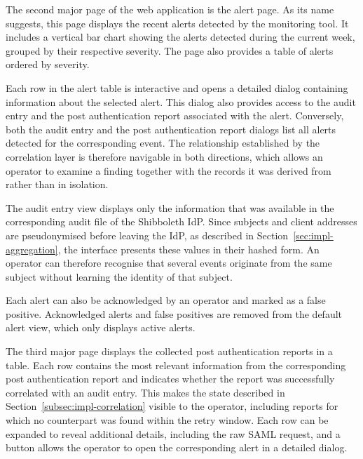 \documentclass[../main.tex]{subfiles}
\begin{document}
The second major page of the web application is the alert page. 
As its name suggests, this page displays the recent alerts detected by the monitoring tool. 
It includes a vertical bar chart showing the alerts detected during the current week, grouped by 
their respective severity. 
The page also provides a table of alerts ordered by severity.

Each row in the alert table is interactive and opens a detailed dialog containing information about 
the selected alert. 
This dialog also provides access to the audit entry and the post authentication report associated with the 
alert. 
Conversely, both the audit entry and the post authentication report dialogs list all alerts detected for 
the corresponding event. 
The relationship established by the correlation layer is therefore navigable in both directions, 
which allows an operator to examine a finding together with the records it was derived from rather 
than in isolation.

The audit entry view displays only the information that was available in the corresponding audit 
file of the Shibboleth IdP. 
Since subjects and client addresses are pseudonymised before leaving the IdP, as described in 
Section~\ref{sec:impl-aggregation}, the interface presents these values in their hashed form. 
An operator can therefore recognise that several events originate from the same subject without 
learning the identity of that subject.

Each alert can also be acknowledged by an operator and marked as a false positive. 
Acknowledged alerts and false positives are removed from the default alert view, which only displays 
active alerts.

The third major page displays the collected post authentication reports in a table. 
Each row contains the most relevant information from the corresponding post authentication report and 
indicates whether the report was successfully correlated with an audit entry. 
This makes the state described in Section~\ref{subsec:impl-correlation} visible to the operator, 
including reports for which no counterpart was found within the retry window. 
Each row can be expanded to reveal additional details, including the raw SAML request, and a button 
allows the operator to open the corresponding alert in a detailed dialog.
\end{document}
